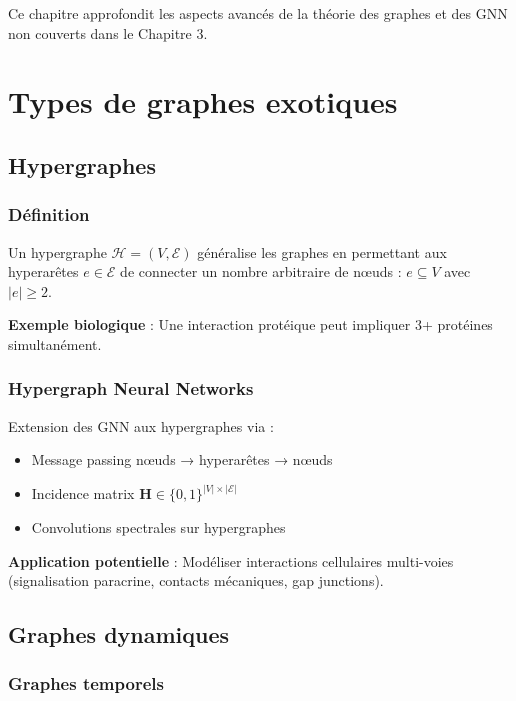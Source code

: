 Ce chapitre approfondit les aspects avancés de la théorie des graphes et des GNN non couverts dans le Chapitre 3.

\section{Types de graphes exotiques}

\subsection{Hypergraphes}

\subsubsection{Définition}

Un hypergraphe $\mathcal{H} = (V, \mathcal{E})$ généralise les graphes en permettant aux hyperarêtes $e \in \mathcal{E}$ de connecter un nombre arbitraire de nœuds : $e \subseteq V$ avec $|e| \geq 2$.

\textbf{Exemple biologique} : Une interaction protéique peut impliquer 3+ protéines simultanément.

\subsubsection{Hypergraph Neural Networks}

Extension des GNN aux hypergraphes via :
\begin{itemize}
    \item Message passing nœuds → hyperarêtes → nœuds
    \item Incidence matrix $\mathbf{H} \in \{0,1\}^{|V| \times |\mathcal{E}|}$
    \item Convolutions spectrales sur hypergraphes
\end{itemize}

\textbf{Application potentielle} : Modéliser interactions cellulaires multi-voies (signalisation paracrine, contacts mécaniques, gap junctions).

\subsection{Graphes dynamiques}

\subsubsection{Graphes temporels}

